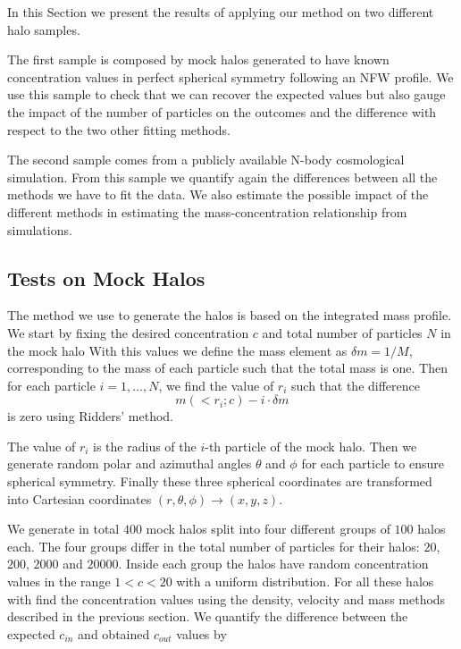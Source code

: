 \documentclass{emulateapj}
\begin{document}
In this Section we present the results of applying our method on two
different halo samples.

The first sample is composed by mock halos generated to have known
concentration values in perfect spherical symmetry following an NFW
profile.
We use this sample to check that we can recover the expected values
but also gauge the impact of the number of particles on the outcomes
and the difference with respect to the two other fitting methods.

The second sample comes from a publicly available N-body cosmological
simulation.
From this sample we quantify again the differences between all the
methods we have to fit the data.
We also estimate the possible impact of the different methods in
estimating the mass-concentration relationship from simulations.

\subsection{Tests on Mock Halos}

The method we use to generate the halos is based on the integrated
mass profile.
We start by fixing the desired concentration $c$ and total number of
particles $N$ in the mock halo
With this values we define the mass element as $\delta m = 1/M$, corresponding
to the mass of each particle such that the total mass is one.
Then for each particle $i=1,\ldots,N$, we find the value of $r_i$ such that
the difference
%
\begin{equation}
m(<r_i;c) - i \cdot \delta m
\end{equation}
%
is zero using Ridders' method.

The value of $r_i$ is the radius of the $i$-th particle of the mock
halo.
Then we generate random polar and azimuthal angles $\theta$ and $\phi$
for each particle to ensure spherical symmetry.
Finally these three spherical coordinates are transformed into Cartesian coordinates
$(r,\theta,\phi) \rightarrow (x,y,z)$.



We generate in total $400$ mock halos split into four different
groups of $100$ halos each.
The four groups differ in the total number of particles for their halos:
$20$, $200$, $2000$ and $20000$.
Inside each group the halos have random concentration values in
the range $1<c<20$ with a uniform distribution.
For all these halos with find the concentration values using the
density, velocity and mass methods described in the previous
section. We quantify the difference between the expected $c_{in}$
and obtained $c_{out}$ values by
\end{document}
